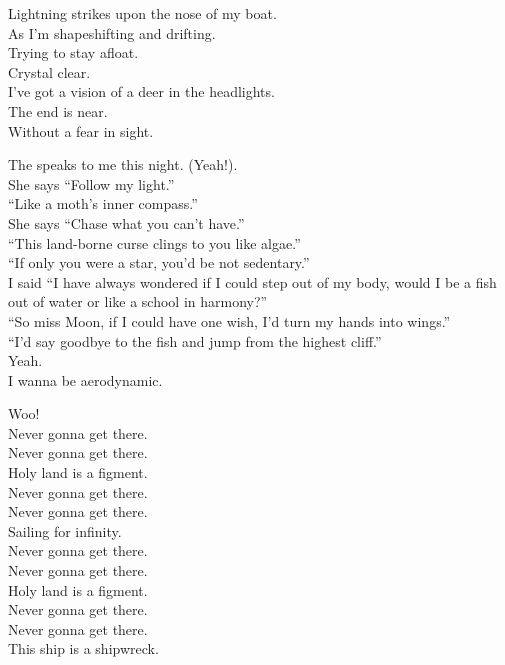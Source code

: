 Lightning strikes upon the nose of my boat. \\
As I'm shapeshifting and drifting. \\
Trying to stay afloat. \\
Crystal clear. \\
I've got a vision of a deer in the headlights. \\
The end is near. \\
Without a fear in sight. \\


The  speaks to me this night. (Yeah!). \\
She says ``Follow my light.'' \\
``Like a moth's inner compass.'' \\
She says ``Chase what you can't have.'' \\
``This land-borne curse clings to you like algae.'' \\
``If only you were a star, you'd be not sedentary.'' \\
I said ``I have always wondered if I could step out of my body, would I be a fish out of water or like a school in harmony?'' \\
``So miss Moon, if I could have one wish, I'd turn my hands into wings.'' \\
``I'd say goodbye to the fish and jump from the highest cliff.'' \\

Yeah. \\
I wanna be aerodynamic. \\


Woo! \\
Never gonna get there. \\
Never gonna get there. \\
Holy land is a figment. \\
Never gonna get there. \\
Never gonna get there. \\
Sailing for infinity. \\
Never gonna get there. \\
Never gonna get there. \\
Holy land is a figment. \\
Never gonna get there. \\
Never gonna get there. \\
This ship is a shipwreck. \\

